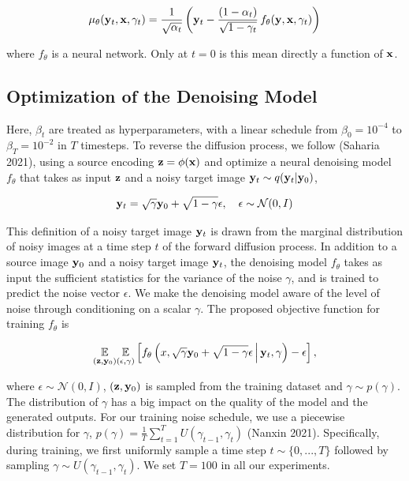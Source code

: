 \documentclass{article}
\begin{document}
\begin{equation}
\mu_{\theta}(\bold{y}_t, \bold{x}, \gamma_t) = \frac{1}{\sqrt{\alpha_t}} \left(\bold{y}_t - \frac{(1 - \alpha_t)}{\sqrt{1 - \gamma_t}} \, f_{\theta}(\bold{y}, \bold{x}, \gamma_t) \right)
\end{equation}

where $f_{\theta}$ is a neural network. Only at $t=0$ is this mean directly a function of $\bold{x}$. 

\subsection{Optimization of the Denoising Model}

Here, $\beta_{t}$ are treated as hyperparameters, with a linear schedule from $\beta_{0}=10^{-4}$ to $\beta_{T}=10^{-2}$ in $T$ timesteps. To reverse the diffusion process, we follow (Saharia 2021), using a source encoding $\bold{z} = \phi(\bold{x})$ and optimize a neural denoising model $f_{\theta}$ that takes as input $\bold{z}$ and a noisy target image $\bold{y}_t \sim q(\bold{y}_t|\bold{y}_0)$,

\begin{equation}
\bold{y}_t = \sqrt{\gamma} \bold{y}_0 + \sqrt{1 - \gamma} \epsilon, \quad \epsilon \sim \mathcal{N}(0, I)
\end{equation}

This definition of a noisy target image $\bold{y}_t$ is drawn from the marginal distribution of noisy images at a time step $t$ of the forward diffusion process. In addition to a source image $\bold{y}_{0}$ and a noisy target image $\bold{y}_t$, the denoising model $f_{\theta}$ takes as input the sufficient statistics for the variance of the noise $\gamma$, and is trained to predict the noise vector $\epsilon$. We make the denoising model aware of the level of noise through conditioning on a scalar $\gamma$. The proposed objective function for training $f_{\theta}$ is

\begin{equation}
\underset{(\bold{z},\bold{y}_{0})}{\mathbb{E}}\underset{(\epsilon,\gamma)}{\mathbb{E}} \left[ f_{\theta}\left(x, \sqrt{\gamma} \bold{y}_0 + \sqrt{1 - \gamma} \epsilon \, \middle|\, \bold{y}_{t}, \gamma\right) - \epsilon \right],
\end{equation} 

where $\epsilon \sim \mathcal{N}(0, I)$, $(\bold{z},\bold{y}_{0})$ is sampled from the training dataset and $\gamma \sim p(\gamma)$. The distribution of $\gamma$ has a big impact on the quality of the model and the generated outputs. For our training noise schedule, we use a piecewise distribution for $\gamma$, $p(\gamma) = \frac{1}{T}\sum_{t=1}^{T} U(\gamma_{t-1}, \gamma_t)$ (Nanxin 2021). Specifically, during training, we first uniformly sample a time step $t \sim \{0, ..., T\}$ followed by sampling $\gamma \sim U(\gamma_{t-1}, \gamma_t)$. We set $T = 100$ in all our experiments.
\end{document}
